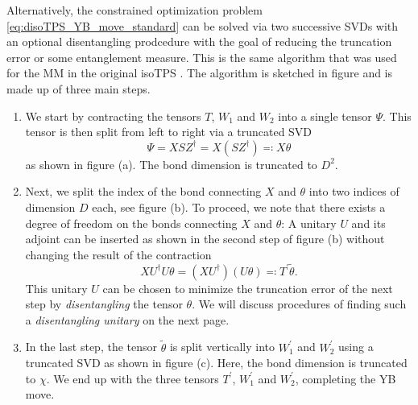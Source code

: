 Alternatively, the constrained optimization problem \eqref{eq:disoTPS_YB_move_standard} can be solved via two successive SVDs with an optional disentangling prodcedure with the goal of reducing the truncation error or some entanglement measure. This is the same algorithm that was used for the MM in the original isoTPS \cite{cite:efficient_simulation_of_dynamics_in_two_dimensional_quantum_spin_systems}. The algorithm is sketched in figure  and is made up of three main steps.
\begin{enumerate}
	\item We start by contracting the tensors $T$, $W_1$ and $W_2$ into a single tensor $\Psi$. This tensor is then split from left to right via a truncated SVD
	\begin{equation}
		\Psi = XSZ^\dagger = X\left(SZ^\dagger\right) \eqqcolon X\theta
	\end{equation}
	as shown in figure (a). The bond dimension is truncated to $D^2$.
	\item Next, we split the index of the bond connecting $X$ and $\theta$ into two indices of dimension $D$ each, see figure (b). To proceed, we note that there exists a degree of freedom on the bonds connecting $X$ and $\theta$: A unitary $U$ and its adjoint can be inserted as shown in the second step of figure (b) without changing the result of the contraction
	\begin{equation}
		XU^\dagger U\theta = \left(XU^\dagger\right)\left(U\theta\right) \eqqcolon T^\prime \tilde{\theta}.
	\end{equation}
	This unitary $U$ can be chosen to minimize the truncation error of the next step by \textit{disentangling} the tensor $\theta$. We will discuss procedures of finding such a \textit{disentangling unitary} on the next page.
	\item In the last step, the tensor $\tilde{\theta}$ is split vertically into $W_1^\prime$ and $W_2^\prime$ using a truncated SVD as shown in figure (c). Here, the bond dimension is truncated to $\chi$. We end up with the three tensors $T^\prime$, $W_1^\prime$ and $W_2^\prime$, completing the YB move.
\end{enumerate}
